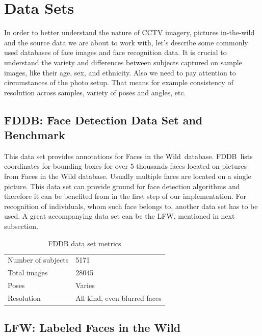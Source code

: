 \section{Data Sets}

In order to better understand the nature of CCTV imagery, pictures in-the-wild and the source data we are about to work with, let's describe some commonly used databases of face images and face recognition data. It is crucial to understand the variety and differences between subjects captured on sample images, like their age, sex, and ethnicity. Also we need to pay attention to circumstances of the photo setup. That means for example consistency of resolution across samples, variety of poses and angles, etc.

\subsection{FDDB: Face Detection Data Set and Benchmark}

This data set provides annotations for Faces in the Wild\,\cite{fiw} database. FDDB\,\cite{fddb} lists coordinates for bounding boxes for over 5 thousands faces located on pictures from Faces in the Wild database. Usually multiple faces are located on a single picture. This data set can provide ground for face detection algorithms and therefore it can be benefited from in the first step of our implementation. For recognition of individuals, whom such face belongs to, another data set has to be used. A great accompanying data set can be the LFW, mentioned in next subsection.

\begin{table}[ht]
    \centering
    \caption{FDDB data set metrics}

    \begin{tabularx}{.8\textwidth}{l|X}
        \toprule
        Number of subjects & \num{5171} \\
        Total images &  \num{28045} \\
        Poses & Varies \\
        Resolution & All kind, even blurred faces \\
        \bottomrule
    \end{tabularx}
\end{table}

\subsection{LFW: Labeled Faces in the Wild}

